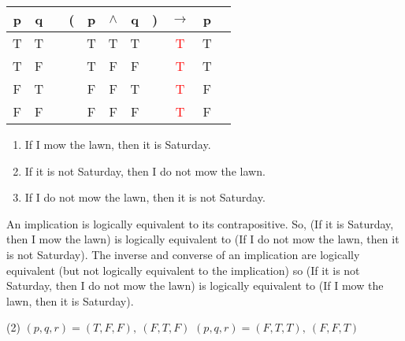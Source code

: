 \begin{Solution}{2.3}
\begin{tasks}
        \task
		\begin{tabular}{@{ }c@{ }@{ }c | c@{ }@{}c@{}@{ }c@{ }@{ }c@{ }@{ }c@{ }@{}c@{}@{ }c@{ }@{ }c@{ }@{ }c}
		p & q &  & ( & p & $\land $ & q & ) & $\rightarrow$ & p & \\
		\hline
		T & T &  &  & T & T & T &  & \textcolor{red}{T} & T & \\
		T & F &  &  & T & F & F &  & \textcolor{red}{T} & T & \\
		F & T &  &  & F & F & T &  & \textcolor{red}{T} & F & \\
		F & F &  &  & F & F & F &  & \textcolor{red}{T} & F & \\
		\end{tabular}
    \end{tasks}
\end{Solution}

\begin{Solution}{2.4}
\begin{enumerate}[label= \alph*)]
\item If I mow the lawn, then it is Saturday.
\item If it is not Saturday, then I do not mow the lawn.
\item If I do not mow the lawn, then it is not Saturday.
\end{enumerate}
\end{Solution}

\begin{Solution}{2.5}
An implication is logically equivalent to its contrapositive. So, (If it is Saturday, 
then I mow the lawn) is logically equivalent to (If I do not mow the lawn, then
it is not Saturday).
The inverse and converse of an implication are logically equivalent (but
not logically equivalent to the implication) so (If it is not Saturday, then I do not
mow the lawn) is logically equivalent to (If I mow the lawn, then it is Saturday).
\end{Solution}


\begin{Solution}{2.6}
\quad
    \begin{tasks}(2)
        \task $(p,q,r)=(T,F,F),\ (F,T,F)$
        \task $(p,q,r)=(F,T,T),\ (F,F,T)$
    \end{tasks}
\end{Solution}

